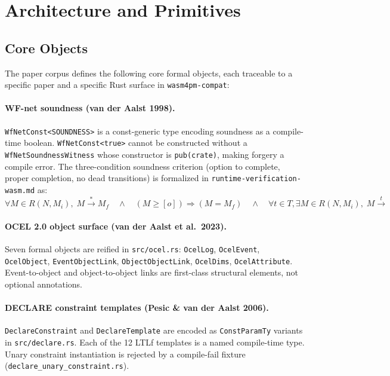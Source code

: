 
\section{Architecture and Primitives}
\label{sec:sources-papers-arch}

\subsection{Core Objects}
\label{sec:sources-papers-arch-objects}

The paper corpus defines the following core formal objects, each traceable to
a specific paper and a specific Rust surface in \texttt{wasm4pm-compat}:

\paragraph{WF-net soundness (van der Aalst 1998).}
\texttt{WfNetConst<SOUNDNESS>} is a const-generic type encoding soundness as a
compile-time boolean. \texttt{WfNetConst<true>} cannot be constructed without a
\texttt{WfNetSoundnessWitness} whose constructor is \texttt{pub(crate)},
making forgery a compile error. The three-condition soundness criterion (option
to complete, proper completion, no dead transitions) is formalized in
\texttt{runtime-verification-wasm.md} as:
\[
\forall M \in R(N, M_i),\; M \xrightarrow{*} M_f \quad
\land \quad (M \geq [o]) \Rightarrow (M = M_f) \quad
\land \quad \forall t \in T, \exists M \in R(N, M_i),\; M \xrightarrow{t}
\]

\paragraph{OCEL 2.0 object surface (van der Aalst et al.\ 2023).}
Seven formal objects are reified in \texttt{src/ocel.rs}:
\texttt{OcelLog}, \texttt{OcelEvent}, \texttt{OcelObject},
\texttt{EventObjectLink}, \texttt{ObjectObjectLink}, \texttt{OcelDims},
\texttt{OcelAttribute}. Event-to-object and object-to-object links are
first-class structural elements, not optional annotations.

\paragraph{DECLARE constraint templates (Pesic \& van der Aalst 2006).}
\texttt{DeclareConstraint} and \texttt{DeclareTemplate} are encoded as
\texttt{ConstParamTy} variants in \texttt{src/declare.rs}. Each of the 12
LTLf templates is a named compile-time type. Unary constraint instantiation
is rejected by a compile-fail fixture (\texttt{declare\_unary\_constraint.rs}).

